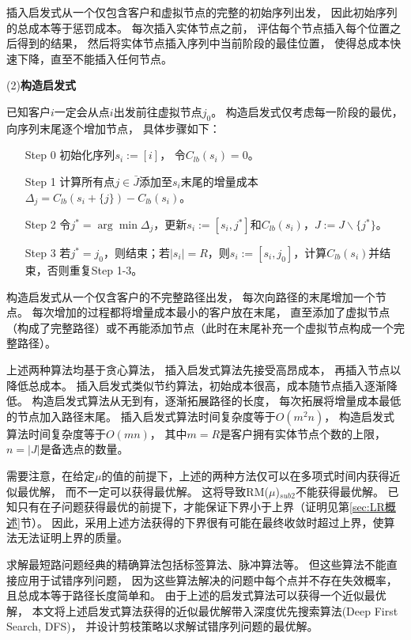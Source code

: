 插入启发式从一个仅包含客户和虚拟节点的完整的初始序列出发，
因此初始序列的总成本等于惩罚成本。
每次插入实体节点之前，
评估每个节点插入每个位置之后得到的结果，
然后将实体节点插入序列中当前阶段的最佳位置，
使得总成本快速下降，直至不能插入任何节点。

(2){\textbf{构造启发式}}

已知客户$i$一定会从点$i$出发前往虚拟节点$j_0$。
构造启发式仅考虑每一阶段的最优，
向序列末尾逐个增加节点，
具体步骤如下：
\begin{enumerate}[leftmargin=0pt,itemindent=3.5\ccwd,nosep]
  \item[Step 0] 初始化序列$s_i:=[i]$， 令$C_{lb}(s_i)=0$。
  \item[Step 1] 计算所有点$j \in \bar{J}$添加至$s_i$末尾的增量成本$\Delta_{j} = C_{lb}(s_i+\{j\}) - C_{lb}(s_i)$。
  \item[Step 2] 令$j^* = \arg \min \Delta_{j}$，更新$s_i:=[s_i, j^*]$和$C_{lb}(s_i)$，$J:=J\backslash\{j^*\}$。
  \item[Step 3] 若$j^*=j_0$，则结束；若$|s_i|=R$，则$s_i:=[s_i, j_0]$，计算$C_{lb}(s_i)$并结束，否则重复Step 1-3。
\end{enumerate}

构造启发式从一个仅含客户的不完整路径出发，
每次向路径的末尾增加一个节点。
每次增加的过程都将增量成本最小的客户放在末尾，
直至添加了虚拟节点（构成了完整路径）或不再能添加节点（此时在末尾补充一个虚拟节点构成一个完整路径）。

上述两种算法均基于贪心算法，
插入启发式算法先接受高昂成本，
再插入节点以降低总成本。
插入启发式类似节约算法，初始成本很高，成本随节点插入逐渐降低。
构造启发式算法从无到有，逐渐拓展路径的长度，
每次拓展将增量成本最低的节点加入路径末尾。
插入启发式算法时间复杂度等于$O(m^2n)$，
构造启发式算法时间复杂度等于$O(mn)$，
其中$m=R$是客户拥有实体节点个数的上限，
$n=|J|$是备选点的数量。

需要注意，在给定$\mu$的值的前提下，上述的两种方法仅可以在多项式时间内获得近似最优解，
而不一定可以获得最优解。
这将导致RM($\mu$)$_{sub2}$不能获得最优解。
已知只有在子问题获得最优的前提下，才能保证下界小于上界（证明见第\ref{sec:LR概述}节）。
因此，采用上述方法获得的下界很有可能在最终收敛时超过上界，使算法无法证明上界的质量。

求解最短路问题经典的精确算法包括标签算法\cite{label}、脉冲算法\cite{pulse}等。
但这些算法不能直接应用于试错序列问题，
因为这些算法解决的问题中每个点并不存在失效概率，
且总成本等于路径长度简单和。
由于上述的启发式算法可以获得一个近似最优解，
本文将上述启发式算法获得的近似最优解带入深度优先搜索算法(Deep First Search, DFS)，
并设计剪枝策略以求解试错序列问题的最优解。

